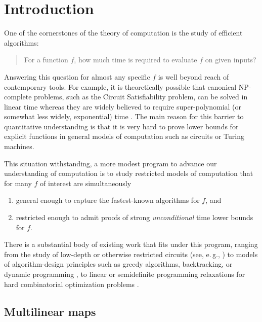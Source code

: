 \documentclass[11pt]{article}
\numberwithin{equation}{section}
\theoremstyle{definition}
\theoremstyle{plain}
\newcommand{\eg}{e.\,g.}
\begin{document}
%
%
%

\section{Introduction}

\noindent
One of the cornerstones of the theory of computation is the study of efficient
algorithms:
\begin{quote}
For a function $f$, how much time is required to evaluate $f$ on given inputs?
\end{quote}
Answering this question for almost any specific $f$ is well beyond
reach of contemporary tools. For example, it is theoretically possible
that canonical NP-complete problems,
such as the Circuit Satisfiability problem, can be solved in linear
time whereas they are widely believed to require super-polynomial
(or somewhat less widely, exponential) time \cite{Gasarch2012,Impagliazzo2001,Impagliazzo2001b}.
The main reason for this barrier to quantitative understanding is that it is
very hard to prove lower bounds for explicit functions in general models
of computation such as circuits or Turing machines.

This situation withstanding, a more modest program to advance our
understanding of computation is to study restricted models of computation
that for many $f$ of interest are simultaneously
\begin{enumerate}%
\item
general enough to capture the fastest-known algorithms for
$f$, and
\item
restricted enough to admit proofs of strong \emph{unconditional} time
lower bounds for $f$.
\end{enumerate}
There is a substantial body of existing work that fits under this program,
ranging from the study of low-depth or otherwise restricted circuits
%
(see, \eg, \cite[Ch. 14]{AroraB2009})  %
to models of algorithm-design principles such as greedy algorithms,
backtracking, or dynamic programming
\cite{AlekhnovichBBIMP2011,DavisI2009}, to linear or semidefinite
programming relaxations for hard combinatorial optimization problems
\cite{LeeRS2015}.

\subsection{Multilinear maps}
\end{document}
